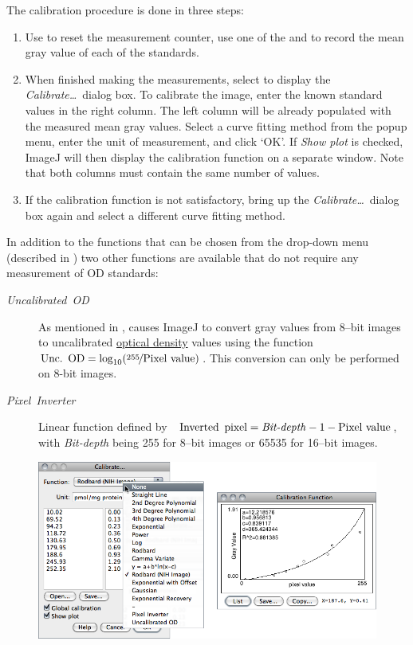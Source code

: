 The calibration procedure is done in three steps: 
\begin{enumerate}
\item Use 
to reset the measurement counter, use one of the 
and 
to record the mean gray value of each of the standards. 
\item When finished making the measurements, select 
to display the \emph{Calibrate\ldots{}}~dialog box. To calibrate
the image, enter the known standard values in the right column. The
left column will be already populated with the measured mean gray
values. Select a curve fitting method from the popup menu, enter the
unit of measurement, and click `OK'. If \emph{Show plot} is checked,
ImageJ will then display the calibration function on a separate window.
Note that both columns must contain the same number of values.
\item If the calibration function is not satisfactory, bring up the \emph{Calibrate\ldots{}}~dialog
box again and select a different curve fitting method.
\end{enumerate}
In addition to the functions that can be chosen from the drop-down
menu (described in )
two other functions are available that do not require any measurement
of OD standards:
\begin{description}
\item [{\emph{Uncalibrated\ OD}}] As mentioned in ,
causes ImageJ to convert gray values from 8--bit images to uncalibrated
\href{http://en.wikipedia.org/wiki/Absorbance}{optical density} values
using the function~ $\mbox{Unc.\,\ OD}=\log_{10}(\nicefrac{255}{\mbox{Pixel value}})$.
This conversion can only be performed on 8-bit images.
\item [{\emph{Pixel\ Inverter}}] Linear function defined by~ $\mbox{Inverted\,\ pixel}=\mbox{\emph{Bit-depth}}-1-\mbox{Pixel value}$,
with \emph{Bit-depth} being 255 for 8--bit images or 65535 for 16--bit
images.
\end{description}
\begin{figure}[h]
\noindent \centering{}\includegraphics[scale=0.55]{images/Calibrate}
\end{figure}



